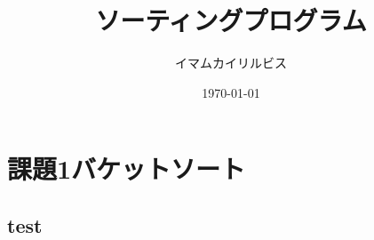 \documentclass[a4j]{jreport}
\begin{document}
\title{ソーティングプログラム}
\author{イマムカイリルビス}
\date{\today}

\maketitle

\chapter{課題1バケットソート}
\section{test}
\end{document}
